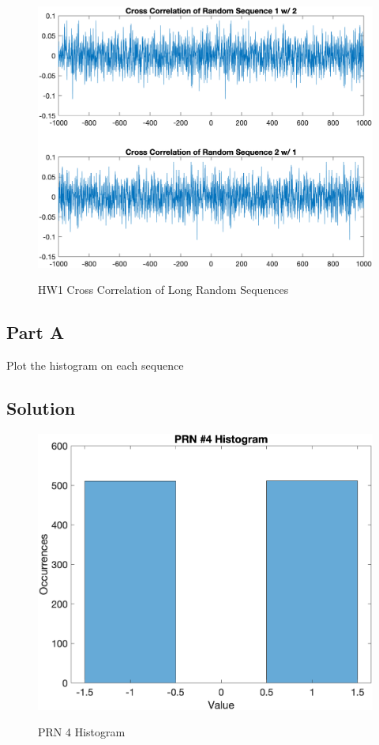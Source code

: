 \documentclass{article}
\begin{document}
\begin{figure}[H]
    \centering
    \includegraphics[width=0.75\linewidth]{../figures/p8_hw1_2bonus2.png}\label{fig:p8_hw1_2bonus2}
    \caption{HW1 Cross Correlation of Long Random Sequences}
\end{figure}

\subsection*{Part A}
Plot the histogram on each sequence

\subsection*{Solution}
\begin{figure}[H]
    \centering
    \includegraphics[width=0.75\linewidth]{../figures/p8_prn4_hist.png}\label{fig:p8_prn4_hist}
    \caption{PRN 4 Histogram }
\end{figure}
\end{document}
